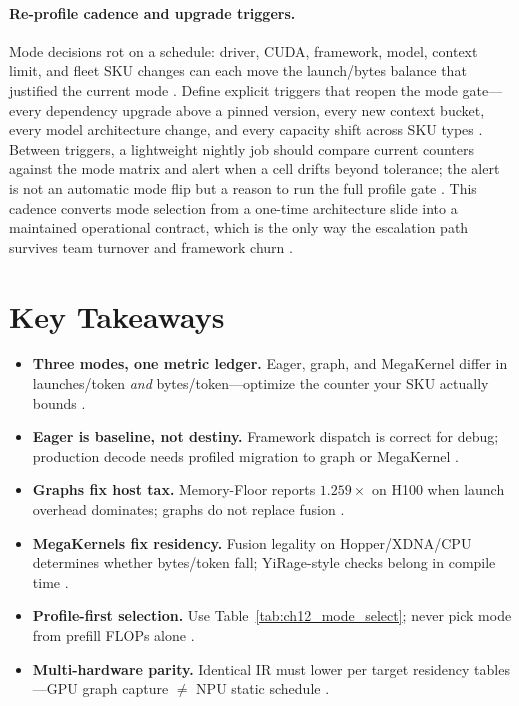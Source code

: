 \paragraph{Re-profile cadence and upgrade triggers.}
Mode decisions rot on a schedule: driver, CUDA, framework, model, context limit, and fleet SKU changes can each move the launch/bytes balance that justified the current mode \citep{nvidia2024cudagraphs,taxbreak2026,memoryfloor2026}. Define explicit triggers that reopen the mode gate---every dependency upgrade above a pinned version, every new context bucket, every model architecture change, and every capacity shift across SKU types \citep{patel2025llminference,yirage2026}. Between triggers, a lightweight nightly job should compare current counters against the mode matrix and alert when a cell drifts beyond tolerance; the alert is not an automatic mode flip but a reason to run the full profile gate \citep{chen2020compilerbasedhardw,kwon2023vllm}. This cadence converts mode selection from a one-time architecture slide into a maintained operational contract, which is the only way the escalation path survives team turnover and framework churn \citep{memoryfloor2026,taxbreak2026}.

\section{Key Takeaways}
\label{sec:ch12_key_takeaways}

\begin{itemize}
\item \textbf{Three modes, one metric ledger.} Eager, graph, and MegaKernel differ in launches/token \emph{and} bytes/token---optimize the counter your SKU actually bounds \citep{taxbreak2026,memoryfloor2026,patel2025llminference}.
\item \textbf{Eager is baseline, not destiny.} Framework dispatch is correct for debug; production decode needs profiled migration to graph or MegaKernel \citep{kwon2023vllm,nvidia2024cudagraphs}.
\item \textbf{Graphs fix host tax.} Memory-Floor reports $1.259\times$ on H100 when launch overhead dominates; graphs do not replace fusion \citep{memoryfloor2026,nvidia2024cudagraphs}.
\item \textbf{MegaKernels fix residency.} Fusion legality on Hopper/XDNA/CPU determines whether bytes/token fall; YiRage-style checks belong in compile time \citep{yirage2026,amd2024xdna,nvidia2022hopper}.
\item \textbf{Profile-first selection.} Use Table~\ref{tab:ch12_mode_select}; never pick mode from prefill FLOPs alone \citep{dao2023flashdecoding,taxbreak2026}.
\item \textbf{Multi-hardware parity.} Identical IR must lower per target residency tables---GPU graph capture $\neq$ NPU static schedule \citep{chen2020compilerbasedhardw,amd2024aie,dlbook}.
\end{itemize}

